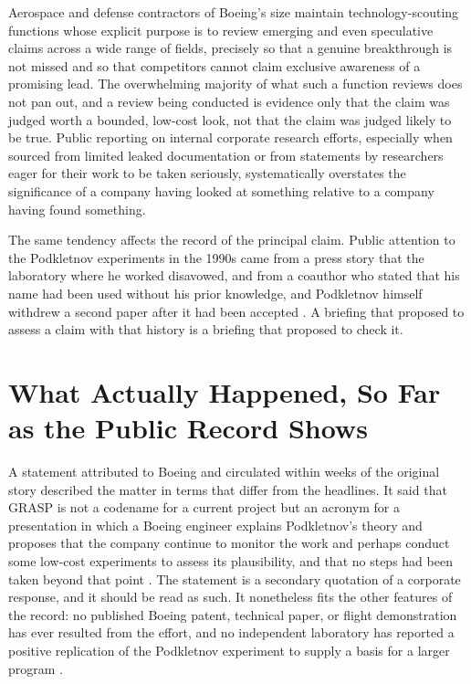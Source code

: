 \documentclass[11pt]{article}
\begin{document}
Aerospace and defense contractors of Boeing's size maintain technology-scouting functions whose explicit purpose is to review emerging and even speculative claims across a wide range of fields, precisely so that a genuine breakthrough is not missed and so that competitors cannot claim exclusive awareness of a promising lead. The overwhelming majority of what such a function reviews does not pan out, and a review being conducted is evidence only that the claim was judged worth a bounded, low-cost look, not that the claim was judged likely to be true. Public reporting on internal corporate research efforts, especially when sourced from limited leaked documentation or from statements by researchers eager for their work to be taken seriously, systematically overstates the significance of a company having looked at something relative to a company having found something.

The same tendency affects the record of the principal claim. Public attention to the Podkletnov experiments in the 1990s came from a press story that the laboratory where he worked disavowed, and from a coauthor who stated that his name had been used without his prior knowledge, and Podkletnov himself withdrew a second paper after it had been accepted \cite{P2003}. A briefing that proposed to assess a claim with that history is a briefing that proposed to check it.

\section{What Actually Happened, So Far as the Public Record Shows}

A statement attributed to Boeing and circulated within weeks of the original story described the matter in terms that differ from the headlines. It said that GRASP is not a codename for a current project but an acronym for a presentation in which a Boeing engineer explains Podkletnov's theory and proposes that the company continue to monitor the work and perhaps conduct some low-cost experiments to assess its plausibility, and that no steps had been taken beyond that point \cite{Boeing2002}. The statement is a secondary quotation of a corporate response, and it should be read as such. It nonetheless fits the other features of the record: no published Boeing patent, technical paper, or flight demonstration has ever resulted from the effort, and no independent laboratory has reported a positive replication of the Podkletnov experiment to supply a basis for a larger program \cite{H2003,W2001}.
\end{document}
